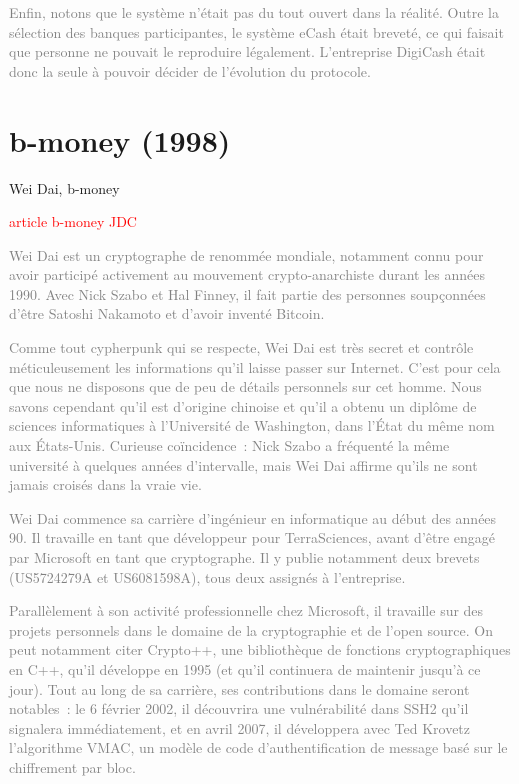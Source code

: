 \textcolor{gray}{Enfin, notons que le système n'était pas du tout ouvert dans la réalité. Outre la sélection des banques participantes, le système eCash était breveté, ce qui faisait que personne ne pouvait le reproduire légalement. L'entreprise DigiCash était donc la seule à pouvoir décider de l'évolution du protocole.}








\section{b-money (1998)}

Wei Dai, b-money

\textcolor{red}{article b-money JDC}

\textcolor{gray}{Wei Dai est un cryptographe de renommée mondiale, notamment connu pour avoir participé activement au mouvement crypto-anarchiste durant les années 1990. Avec Nick Szabo et Hal Finney, il fait partie des personnes soupçonnées d'être Satoshi Nakamoto et d'avoir inventé Bitcoin.}

\textcolor{gray}{Comme tout cypherpunk qui se respecte, Wei Dai est très secret et contrôle méticuleusement les informations qu'il laisse passer sur Internet. C'est pour cela que nous ne disposons que de peu de détails personnels sur cet homme. Nous savons cependant qu'il est d'origine chinoise et qu'il a obtenu un diplôme de sciences informatiques à l'Université de Washington, dans l'État du même nom aux États-Unis. Curieuse coïncidence~: Nick Szabo a fréquenté la même université à quelques années d'intervalle, mais Wei Dai affirme qu'ils ne sont jamais croisés dans la vraie vie.}

\textcolor{gray}{Wei Dai commence sa carrière d'ingénieur en informatique au début des années 90. Il travaille en tant que développeur pour TerraSciences, avant d'être engagé par Microsoft en tant que cryptographe. Il y publie notamment deux brevets (US5724279A et US6081598A), tous deux assignés à l'entreprise.}

\textcolor{gray}{Parallèlement à son activité professionnelle chez Microsoft, il travaille sur des projets personnels dans le domaine de la cryptographie et de l'open source. On peut notamment citer Crypto++, une bibliothèque de fonctions cryptographiques en C++, qu'il développe en 1995 (et qu'il continuera de maintenir jusqu'à ce jour). Tout au long de sa carrière, ses contributions dans le domaine seront notables~: le 6 février 2002, il découvrira une vulnérabilité dans SSH2 qu'il signalera immédiatement, et en avril 2007, il développera avec Ted Krovetz l'algorithme VMAC, un modèle de code d'authentification de message basé sur le chiffrement par bloc.}

